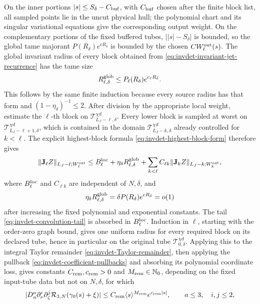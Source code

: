 On the inner portions \(|s|\leq S_\delta-C_{\rm buf}\), with
\(C_{\rm buf}\) chosen after the finite block list, all sampled points lie
in the uncut physical hull; the polynomial chart and its singular
variational equations give the corresponding output weight.  On the
complementary portions of the fixed buffered tubes,
\(\bigl||s|-S_\delta\bigr|\) is bounded, so the global tame majorant
\(P(R_\delta)e^{cR_\delta}\) is bounded by the chosen
\(CW_\ell^{\rm out}(s)\).
The global invariant radius of every block obtained from
\cref{eq:invdet-invariant-jet-recurrence} has the tame size
\[
 R_{\ell,\delta}^{\rm glob}\leq P_\ell(R_\delta)e^{c_\ell R_\delta}.
\]
This follows by the same finite induction because every source radius has
that form and \((1-\eta_\delta)^{-1}\leq2\).  After division by the
appropriate local weight, estimate the \(\ell\)-th block on
\(\mathcal T^{\chi d}_{L_J-\ell,\delta}\).  Every lower block is sampled at
worst on \(\mathcal T^{\chi d}_{L_J-\ell+1,\delta}\), which is contained in
the domain \(\mathcal T^{\chi d}_{L_J-k,\delta}\) already controlled for
\(k<\ell\).
The explicit highest-block formula
\cref{eq:invdet-highest-block-form} therefore gives
\begin{equation}
 \|\mathbf J_\ell Z\|_{L_J-\ell;W_\ell^{\rm out}}
 \leq B_\ell^{\rm loc}
   +\eta_\delta R_{\ell,\delta}^{\rm glob}
   +\sum_{k<\ell}C_{\ell k}
       \|\mathbf J_k Z\|_{L_J-k;W_k^{\rm out}},       \label{eq:invdet-local-block-recurrence}
\end{equation}
where \(B_\ell^{\rm loc}\) and \(C_{\ell k}\) are independent of
\(N,\delta\),
and
\[
 \eta_\delta R_{\ell,\delta}^{\rm glob}
 =\delta P(R_\delta)e^{cR_\delta}=o(1)
\]
after increasing the fixed polynomial and exponential constants.
The tail
\cref{eq:invdet-convolution-tail} is absorbed in \(B_\ell^{\rm loc}\).
Induction in \(\ell\), starting with the order-zero graph bound, gives one
uniform radius for every required block on its declared tube, hence in
particular on the original tube \(\mathcal T^{\chi d}_{0,\delta}\).
Applying this to
the integral Taylor remainder
\cref{eq:invdet-Taylor-remainder}, then applying the pullback
\cref{eq:invdet-coefficient-pullbacks} and absorbing its polynomial
coordinate loss, gives constants \(C_{\rm rem},c_{\rm rem}>0\) and
\(M_{\rm rem}\in\mathbb N_0\), depending on the fixed input-tube data but
not on \(N,\delta\), for which
\begin{equation}
 |D_u^a\partial_\nu^i\partial_\zeta^j
       \mathcal R_{3,N}(\gamma_0(s)+\xi)|
 \leq C_{\rm rem}\langle s\rangle^{M_{\rm rem}}
          e^{c_{\rm rem}|s|},
 \qquad a\leq3,\quad i,j\leq2,                       \label{eq:invdet-local-remainder}
\end{equation}
